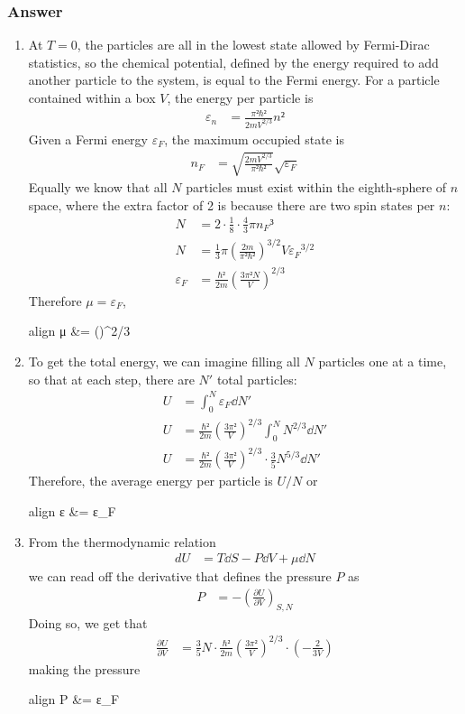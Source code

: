 \subsubsection{Answer}
\begin{enumerate}
	\item
		At $T = 0$, the particles are all in the lowest state allowed by
		Fermi-Dirac statistics, so the chemical potential, defined by the
		energy required to add another particle to the system, is equal to the
		Fermi energy. For a particle contained within a box $V$, the energy
		per particle is
		\begin{align*}
			ε_n &= \frac{π²ℏ²}{2mV^{2/3}} n²
		\end{align*}
		Given a Fermi energy $ε_F$, the maximum occupied state is
		\begin{align*}
			n_F &= \sqrt{\frac{2mV^{2/3}}{π²ℏ²}} \sqrt{ε_F}
		\end{align*}
		Equally we know that all $N$ particles must exist within the
		eighth-sphere of $n$ space, where the extra factor of 2 is because
		there are two spin states per $n$:
		\begin{align*}
			N &= 2·\frac 18 · \frac 43 π{n_F}³ \\
			N &= \frac 13 π ( \frac{2m}{π²ℏ²} )^{3/2} V {ε_F}^{3/2} \\
			ε_F &= \frac{ℏ²}{2m} (\frac{3π²N}{V})^{2/3}
		\end{align*}
		Therefore $μ = ε_F$,
		\begin{empheq}[box=\fbox]{align}
			μ &=  ()^{2/3}
		\end{empheq}
	\item
		To get the total energy, we can imagine filling all $N$ particles one
		at a time, so that at each step, there are $N'$ total particles:
		\begin{align*}
			U &= ∫_0^N ε_F \dd N' \\
			U &= \frac{ℏ²}{2m} (\frac{3π²}{V})^{2/3} ∫_0^N N^{2/3} \dd N' \\
			U &= \frac{ℏ²}{2m} (\frac{3π²}{V})^{2/3} · \frac 35 N^{5/3} \dd N'
		\end{align*}
		Therefore, the average energy per particle is $U/N$ or
		\begin{empheq}[box=\fbox]{align}
			\langle ε \rangle &=  ε_F
		\end{empheq}
	\item
		From the thermodynamic relation
		\begin{align*}
			dU &= T\dd S - P\dd V + μ\dd N
		\end{align*}
		we can read off the derivative that defines the pressure $P$ as
		\begin{align*}
			P &= - ( \frac{∂U}{∂V} )_{S,N}
		\end{align*}
		Doing so, we get that
		\begin{align*}
			\frac{∂U}{∂V} &= \frac 35 N · \frac{ℏ²}{2m} (\frac{3π²}{V})^{2/3} ·
				(-\frac{2}{3V})
		\end{align*}
		making the pressure
		\begin{empheq}[box=\fbox]{align}
			P &=   ε_F
		\end{empheq}
\end{enumerate}


